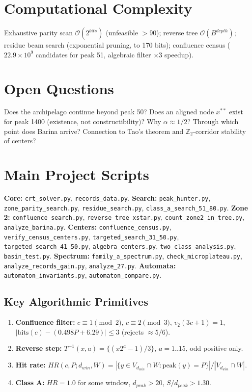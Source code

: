 \documentclass[12pt,a4paper]{article}
\theoremstyle{remark}
\begin{document}
\section{Computational Complexity}
Exhaustive parity scan $\mathcal O(2^{bits})$ (unfeasible $>90$); reverse tree $\mathcal O(B^{depth})$; residue beam search (exponential pruning, to 170 bits); confluence census ($22.9\times10^9$ candidates for peak 51, algebraic filter $\times3$ speedup).

\section{Open Questions}
Does the archipelago continue beyond peak 50? Does an aligned node $x^{**}$ exist for peak 1400 (existence, not constructibility)? Why $\alpha\approx1/2$? Through which point does Barina arrive? Connection to Tao's theorem and $\mathbb Z_2$-corridor stability of centers?

\appendix
\section{Main Project Scripts}
\textbf{Core:} \texttt{crt\_solver.py}, \texttt{records\_data.py}. \textbf{Search:} \texttt{peak\_hunter.py}, \texttt{zone\_parity\_search.py}, \texttt{residue\_search.py}, \texttt{class\_a\_search\_51\_80.py}. \textbf{Zone 2:} \texttt{confluence\_search.py}, \texttt{reverse\_tree\_xstar.py}, \texttt{count\_zone2\_in\_tree.py}, \texttt{analyze\_barina.py}. \textbf{Centers:} \texttt{confluence\_census.py}, \texttt{verify\_census\_centers.py}, \texttt{targeted\_search\_31\_50.py}, \texttt{targeted\_search\_41\_50.py}, \texttt{algebra\_centers.py}, \texttt{two\_class\_analysis.py}, \texttt{basin\_test.py}. \textbf{Spectrum:} \texttt{family\_a\_spectrum.py}, \texttt{check\_microplateau.py}, \texttt{analyze\_records\_gain.py}, \texttt{analyze\_27.py}. \textbf{Automata:} \texttt{automaton\_invariants.py}, \texttt{automaton\_compare.py}.

\subsection*{Key Algorithmic Primitives}
\begin{enumerate}
\item \textbf{Confluence filter:} $c\equiv1\pmod2$, $c\equiv2\pmod3$, $v_2(3c+1)=1$, $|\mathrm{bits}(c)-(0.498P+6.29)|\le3$ (rejects $\approx5/6$).
\item \textbf{Reverse step:} $T^{-1}(x,a)=\{(x2^a-1)/3\}$, $a=1..15$, odd positive only.
\item \textbf{Hit rate:} $HR(c,P;d_{win},W)=|\{y\in V_{d_{win}}\cap W:\mathrm{peak}(y)=P\}|/|V_{d_{win}}\cap W|$.
\item \textbf{Class A:} $HR=1.0$ for some window, $d_{peak}>20$, $S/d_{peak}>1.30$.
\end{enumerate}
\end{document}
